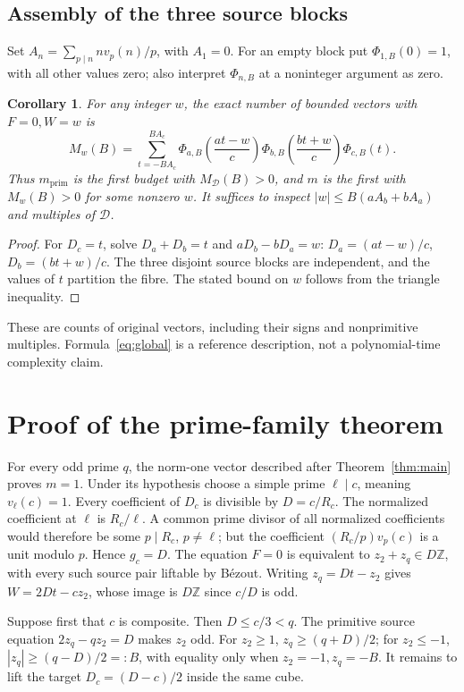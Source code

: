 \documentclass[11pt,a4paper]{article}
\newtheorem{corollary}[theorem]{Corollary}
\theoremstyle{definition}\newtheorem{question}[theorem]{Question}
\theoremstyle{remark}\newtheorem{remark}[theorem]{Remark}
\newcommand{\Z}{\mathbb Z}\newcommand{\R}{\mathbb R}
\newcommand{\Dgen}{\mathcal D}\newcommand{\mpr}{m_{\mathrm{prim}}}
\begin{document}
\subsection{Assembly of the three source blocks}
Set \(A_n=\sum_{p\mid n}n v_p(n)/p\), with \(A_1=0\).
For an empty block put \(\Phi_{1,B}(0)=1\), with all other values zero;
also interpret \(\Phi_{n,B}\) at a noninteger argument as zero.
\begin{corollary}\label{cor:global}
For any integer \(w\), the exact number of bounded vectors with
\(F=0,W=w\) is
\begin{equation}\label{eq:global}
 M_w(B)=\sum_{t=-BA_c}^{BA_c}
 \Phi_{a,B}\!\left(\frac{at-w}{c}\right)
 \Phi_{b,B}\!\left(\frac{bt+w}{c}\right)\Phi_{c,B}(t).
\end{equation}
Thus \(\mpr\) is the first budget with \(M_{\Dgen}(B)>0\), and \(m\)
is the first with \(M_w(B)>0\) for some nonzero \(w\).
It suffices to inspect
\(|w|\le B(aA_b+bA_a)\) and multiples of \(\Dgen\).
\end{corollary}
\begin{proof}
For \(D_c=t\), solve \(D_a+D_b=t\) and \(aD_b-bD_a=w\):
\(D_a=(at-w)/c\), \(D_b=(bt+w)/c\). The three disjoint source blocks
are independent, and the values of \(t\) partition the fibre.
The stated bound on \(w\) follows from the triangle inequality.
\end{proof}
These are counts of original vectors, including their signs and
nonprimitive multiples. Formula~\eqref{eq:global} is a reference
description, not a polynomial-time complexity claim.

\section{Proof of the prime-family theorem}\label{sec:main-proof}
For every odd prime $q$, the norm-one vector described after
Theorem~\ref{thm:main} proves $m=1$. Under its hypothesis choose a
simple prime $\ell\mid c$, meaning $v_\ell(c)=1$.
Every coefficient of $D_c$ is divisible by $D=c/R_c$.
The normalized coefficient at $\ell$ is $R_c/\ell$.
A common prime divisor of all normalized coefficients would therefore
be some $p\mid R_c$, $p\ne\ell$; but the coefficient
$(R_c/p)v_p(c)$ is a unit modulo $p$. Hence $g_c=D$.
The equation $F=0$ is equivalent to $z_2+z_q\in D\Z$, with every
such source pair liftable by B\'ezout. Writing $z_q=Dt-z_2$ gives
$W=2Dt-cz_2$, whose image is $D\Z$ since $c/D$ is odd.

Suppose first that $c$ is composite. Then $D\le c/3<q$.
The primitive source equation $2z_q-qz_2=D$ makes $z_2$ odd.
For $z_2\ge1$, $z_q\ge(q+D)/2$; for $z_2\le-1$,
$|z_q|\ge(q-D)/2=:B$, with equality only when $z_2=-1,z_q=-B$.
It remains to lift the target $D_c=(D-c)/2$ inside the same cube.
\end{document}
